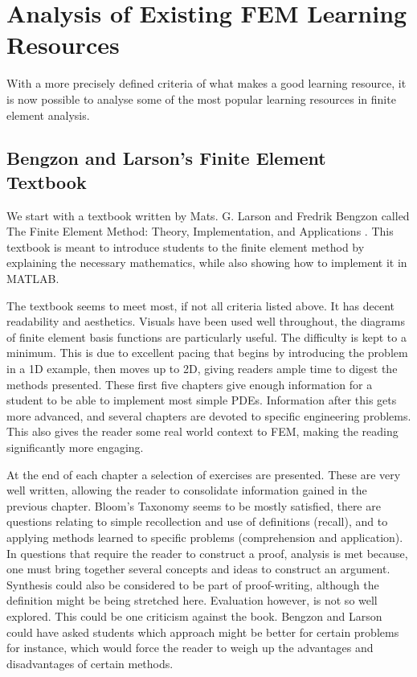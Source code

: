 \section{Analysis of Existing FEM Learning Resources} \label{analysis-of-existing-resources}

With a more precisely defined criteria of what makes a good learning resource, it is now possible to analyse some of the most popular learning resources in finite element analysis.

\subsection{Bengzon and Larson's Finite Element Textbook} \label{subsection:bengzon-larson}

We start with a textbook written by Mats. G. Larson and Fredrik Bengzon called The Finite Element Method: Theory, Implementation, and Applications \cite{bengzon-larson-fem}. This textbook is meant to introduce students to the finite element method by explaining the necessary mathematics, while also showing how to implement it in MATLAB. 

The textbook seems to meet most, if not all criteria listed above. It has decent readability and aesthetics. Visuals have been used well throughout, the diagrams of finite element basis functions are particularly useful. The difficulty is kept to a minimum. This is due to excellent pacing that begins by introducing the problem in a 1D example, then moves up to 2D, giving readers ample time to digest the methods presented. These first five chapters give enough information for a student to be able to implement most simple PDEs. Information after this gets more advanced, and several chapters are devoted to specific engineering problems. This also gives the reader some real world context to FEM, making the reading significantly more engaging.

At the end of each chapter a selection of exercises are presented. These are very well written, allowing the reader to consolidate information gained in the previous chapter. Bloom's Taxonomy seems to be mostly satisfied, there are questions relating to simple recollection and use of definitions (recall), and to applying methods learned to specific problems (comprehension and application). In questions that require the reader to construct a proof, analysis is met because, one must bring together several concepts and ideas to construct an argument. Synthesis could also be considered to be part of proof-writing, although the definition might be being stretched here. Evaluation however, is not so well explored. This could be one criticism against the book. Bengzon and Larson could have asked students which approach might be better for certain problems for instance, which would force the reader to weigh up the advantages and disadvantages of certain methods.

